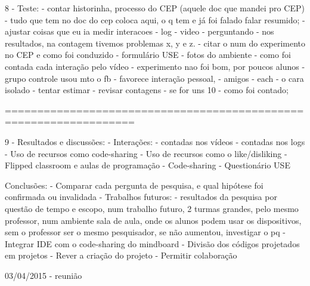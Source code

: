         8 - Teste:
            - contar historinha, processo do CEP (aquele doc que mandei pro CEP)
            - tudo que tem no doc do cep coloca aqui, o q tem e já foi falado falar resumido;
            - ajustar coisas que eu ia medir interacoes
                - log
                - video
                - perguntando
                - nos resultados, na contagem tivemos problemas x, y e z.
            - citar o num do experimento no CEP e como foi conduzido
            - formulário USE
            - fotos do ambiente
                - como foi contada cada interação pelo vídeo
            - experimento nao foi bom, por poucos alunos
                - grupo controle usou mto o fb
                - favorece interação pessoal,
                - amigos
                - each
                - o cara isolado
                - tentar estimar %
                    - revisar contagens - se for uns 10%
                - como foi contado;

        ==================================================================

        9 - Resultados e discussões:
            - Interações:
                - contadas nos vídeos
                - contadas nos logs
            - Uso de recursos como code-sharing
            - Uso de recursos como o like/disliking
            - Flipped classroom e aulas de programação
            - Code-sharing
            - Questionário USE

        Conclusões:
            - Comparar cada pergunta de pesquisa, e qual hipótese foi confirmada ou invalidada
            - Trabalhos futuros:
                - resultados da pesquisa por questão de tempo e escopo, num trabalho futuro, 2 turmas grandes, pelo mesmo professor, num ambiente sala de aula, onde os alunos podem usar os dispositivos, sem o professor ser o mesmo pesquisador, se não aumentou, investigar o pq
                - Integrar IDE com o code-sharing do mindboard
                - Divisão dos códigos projetados em projetos
                - Rever a criação do projeto
                - Permitir colaboração

        03/04/2015 - reunião
\fi

